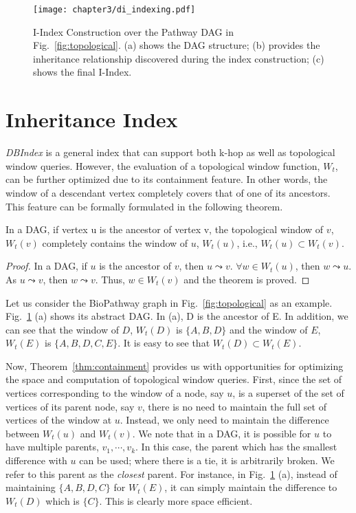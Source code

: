 \begin{figure}[t]
\centering
\texttt{[image: chapter3/di\_indexing.pdf]}
	\caption{I-Index Construction over the Pathway DAG in Fig.~\ref{fig:topological}. (a) shows the DAG structure; (b) provides the inheritance relationship discovered during the index construction; (c) shows the final I-Index.}
	\label{fig:diff-index}
\end{figure}

\section{Inheritance Index}
\textit{DBIndex} is a general index that can support both k-hop as well as
topological window queries. 
However, the evaluation of a topological window function, $W_t$, 
can be further optimized due to its containment feature. 
In other words, the window of a descendant vertex 
completely covers that of one of its ancestors. 
This feature can be formally formulated in the following theorem. 

\begin{theorem}
\label{thm:containment}
In a DAG, if vertex u is the ancestor of vertex v, the topological window of $v$, $W_t(v)$ completely contains the window of $u$, $W_t(u)$, i.e., $W_t(u) \subset W_t(v)$.   
\end{theorem}

\begin{proof}
In a DAG, if $u$ is the ancestor of $v$, then $u \leadsto v$. $\forall w \in W_t(u)$, then $w \leadsto u$. As $u \leadsto v$, then $w \leadsto v$. Thus, $w \in W_t(v)$ and the theorem is proved.   
\end{proof}

Let us consider the BioPathway graph in Fig.~\ref{fig:topological} as
an example.
Fig.~\ref{fig:diff-index} (a) shows its abstract DAG. In (a), 
D is the ancestor of E. In addition, we can see that the window of $D$, 
$W_t(D)$ is $\{A, B, D\}$ and the window of $E$, $W_t(E)$ is $\{A, B, D, C, E\}$. It is easy to see that $W_t(D) \subset W_t(E)$. 

Now, Theorem~\ref{thm:containment} provides us with opportunities for optimizing
the space and computation of topological window queries. 
First, since the set of vertices corresponding to the
window of a node, say $u$, is a superset of the set of vertices of its
parent node, say $v$, there is no need to maintain the full set of 
vertices of the window at $u$. Instead, 
we only need to maintain the difference between 
$W_t(u)$ and $W_t(v)$. We note that in a DAG, it is possible for $u$ to have
multiple parents, $v_1, \cdots, v_k$. In this case, the parent
which has the smallest difference with $u$ can be used; where there
is a tie, it is arbitrarily broken.
We refer to this parent as the {\em closest} parent. For instance, in Fig.~\ref{fig:diff-index} (a), instead of maintaining 
$\{A, B, D, C\}$ for $W_t(E)$, it can simply maintain the difference 
to $W_t(D)$ which is $\{C\}$. This is clearly more space efficient.

